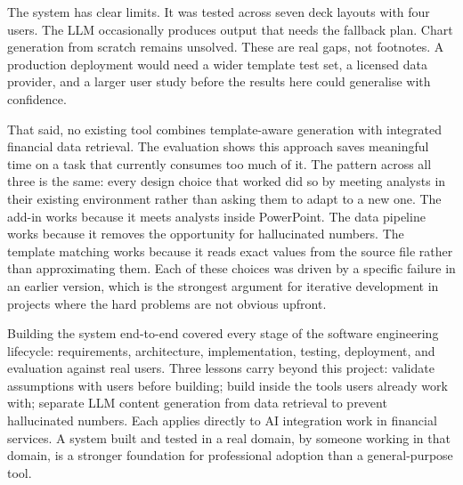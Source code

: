 The system has clear limits. It was tested across seven deck layouts with four users. The LLM occasionally produces output that needs the fallback plan. Chart generation from scratch remains unsolved. These are real gaps, not footnotes. A production deployment would need a wider template test set, a licensed data provider, and a larger user study before the results here could generalise with confidence.

That said, no existing tool combines template-aware generation with integrated financial data retrieval. The evaluation shows this approach saves meaningful time on a task that currently consumes too much of it. The pattern across all three is the same: every design choice that worked did so by meeting analysts in their existing environment rather than asking them to adapt to a new one. The add-in works because it meets analysts inside PowerPoint. The data pipeline works because it removes the opportunity for hallucinated numbers. The template matching works because it reads exact values from the source file rather than approximating them. Each of these choices was driven by a specific failure in an earlier version, which is the strongest argument for iterative development in projects where the hard problems are not obvious upfront.

Building the system end-to-end covered every stage of the software engineering lifecycle: requirements, architecture, implementation, testing, deployment, and evaluation against real users. Three lessons carry beyond this project: validate assumptions with users before building; build inside the tools users already work with; separate LLM content generation from data retrieval to prevent hallucinated numbers. Each applies directly to AI integration work in financial services. A system built and tested in a real domain, by someone working in that domain, is a stronger foundation for professional adoption than a general-purpose tool.
